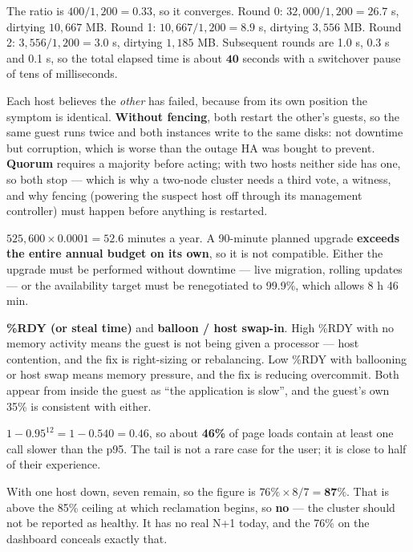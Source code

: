 \begin{ans}
  \item The ratio is $400/1{,}200 = \mathbf{0.33}$, so it converges.
        Round 0: $32{,}000/1{,}200 = 26.7$ s, dirtying $10{,}667$ MB.
        Round 1: $10{,}667/1{,}200 = 8.9$ s, dirtying $3{,}556$ MB.
        Round 2: $3{,}556/1{,}200 = 3.0$ s, dirtying $1{,}185$ MB.
        Subsequent rounds are 1.0 s, 0.3 s and 0.1 s, so the total elapsed time
        is about $\mathbf{40}$ seconds with a switchover pause of tens of
        milliseconds.
  \item Each host believes the \emph{other} has failed, because from its own
        position the symptom is identical. \textbf{Without fencing}, both
        restart the other's guests, so the same guest runs twice and both
        instances write to the same disks: not downtime but corruption, which is
        worse than the outage HA was bought to prevent. \textbf{Quorum} requires
        a majority before acting; with two hosts neither side has one, so both
        stop --- which is why a two-node cluster needs a third vote, a witness,
        and why fencing (powering the suspect host off through its management
        controller) must happen before anything is restarted.
  \item $525{,}600 \times 0.0001 = \mathbf{52.6}$ minutes a year. A 90-minute
        planned upgrade \textbf{exceeds the entire annual budget on its own},
        so it is not compatible. Either the upgrade must be performed without
        downtime --- live migration, rolling updates --- or the availability
        target must be renegotiated to 99.9\%, which allows 8 h 46 min.
\end{ans}

\begin{ans}
  \item \textbf{\%RDY (or steal time)} and \textbf{balloon / host swap-in}.
        High \%RDY with no memory activity means the guest is not being given a
        processor --- host contention, and the fix is right-sizing or
        rebalancing. Low \%RDY with ballooning or host swap means memory
        pressure, and the fix is reducing overcommit. Both appear from inside
        the guest as ``the application is slow'', and the guest's own 35\% is
        consistent with either.
  \item $1 - 0.95^{12} = 1 - 0.540 = \mathbf{0.46}$, so about \textbf{46\%} of
        page loads contain at least one call slower than the p95. The tail is
        not a rare case for the user; it is close to half of their experience.
  \item With one host down, seven remain, so the figure is
        $76\% \times 8/7 = \mathbf{87\%}$. That is above the 85\% ceiling at
        which reclamation begins, so \textbf{no} --- the cluster should not be
        reported as healthy. It has no real N+1 today, and the 76\% on the
        dashboard conceals exactly that.
\end{ans}

